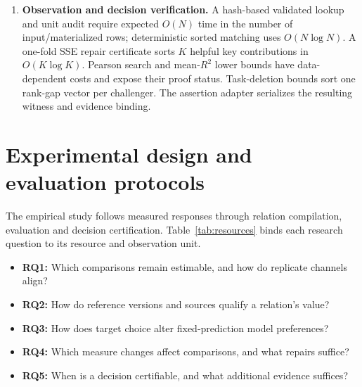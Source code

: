 \documentclass[preprint,12pt,number,sort&compress]{elsarticle}
\begin{document}
\begin{enumerate}
\item \textbf{Observation and decision verification.} A hash-based validated lookup and unit audit require expected $O(N)$ time in the number of input/materialized rows; deterministic sorted matching uses $O(N\log N)$. A one-fold SSE repair certificate sorts $K$ helpful key contributions in $O(K\log K)$. Pearson search and mean-$R^2$ lower bounds have data-dependent costs and expose their proof status. Task-deletion bounds sort one rank-gap vector per challenger. The assertion adapter serializes the resulting witness and evidence binding.
\end{enumerate}

\section{Experimental design and evaluation protocols}\label{sec:design}
The empirical study follows measured responses through relation compilation, evaluation and decision certification. Table~\ref{tab:resources} binds each research question to its resource and observation unit.
\begin{itemize}
\item \textbf{RQ1:} Which comparisons remain estimable, and how do replicate channels align?
\item \textbf{RQ2:} How do reference versions and sources qualify a relation's value?
\item \textbf{RQ3:} How does target choice alter fixed-prediction model preferences?
\item \textbf{RQ4:} Which measure changes affect comparisons, and what repairs suffice?
\item \textbf{RQ5:} When is a decision certifiable, and what additional evidence suffices?
\end{itemize}
\end{document}
